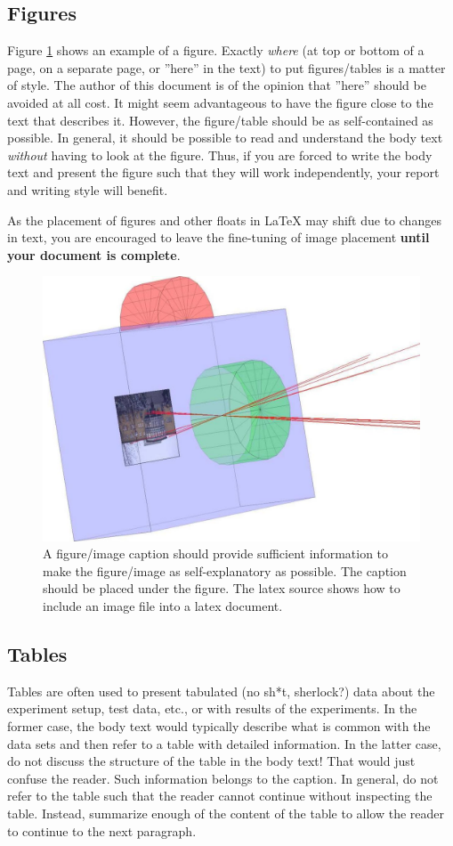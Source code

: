 \documentclass{article}
\begin{document}
\subsection{Figures}
\label{app:figures}
Figure \ref{fig:image} shows an example of a figure. Exactly \emph{where} (at top
or bottom of a page, on a separate page, or ''here'' in the text) to
put figures/tables is a matter of style. The author of this document
is of the opinion that ''here'' should be avoided at all cost. It
might seem advantageous to have the figure close to the text that
describes it. However, the figure/table should be as self-contained as
possible. In general, it should be possible to read and understand the
body text \emph{without} having to look at the figure. Thus, if you are
forced to write the body text and present the figure such that they
will work independently, your report and writing style will benefit.

As the placement of figures and other floats in \LaTeX{} may shift due to
changes in text, you are encouraged to leave the fine-tuning of image
placement \textbf{until your document is complete}.

\begin{figure}[tbp]
\centering
\includegraphics[width=0.7\hsize]{./camwithimage8.jpg}
\caption{\label{fig:image}A figure/image caption should provide sufficient information to make the figure/image as self-explanatory as possible. The caption should be placed under the figure. The latex source shows how to include an image file into a latex document.}
\end{figure}

\subsection{Tables}
\label{app:tables}
Tables are often used to present tabulated (no sh*t, sherlock?) data
about the experiment setup, test data, etc., or with results of the
experiments. In the former case, the body text would typically
describe what is common with the data sets and then refer to a table
with detailed information. In the latter case, do not discuss the
structure of the table in the body text! That would just confuse the
reader. Such information belongs to the caption. In general, do not
refer to the table such that the reader cannot continue without
inspecting the table. Instead, summarize enough of the content of the
table to allow the reader to continue to the next paragraph.
\end{document}
